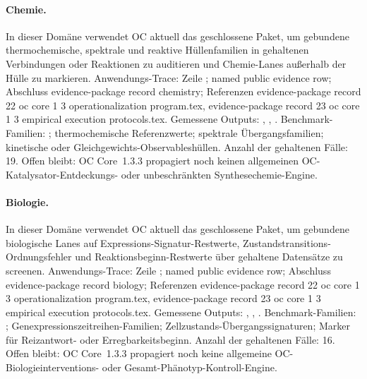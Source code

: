 \paragraph{Chemie.}
In dieser Domäne verwendet OC aktuell das geschlossene Paket, um gebundene thermochemische, spektrale und reaktive Hüllenfamilien in gehaltenen Verbindungen oder Reaktionen zu auditieren und Chemie-Lanes außerhalb der Hülle zu markieren.
Anwendungs-Trace: Zeile ; named public evidence row; \allowbreak Abschluss evidence-package record chemistry; \allowbreak Referenzen evidence-package record 22 oc core 1 3 operationalization program.tex, \allowbreak evidence-package record 23 oc core 1 3 empirical execution protocols.tex.
Gemessene Outputs: , , .
Benchmark-Familien: ; thermochemische Referenzwerte; spektrale Übergangsfamilien; kinetische oder Gleichgewichts-\allowbreak Observableshüllen.
Anzahl der gehaltenen Fälle: 19.
Offen bleibt: OC Core~1.3.3 propagiert noch keinen allgemeinen OC-Katalysator-Entdeckungs- oder unbeschränkten Synthesechemie-Engine.

\paragraph{Biologie.}
In dieser Domäne verwendet OC aktuell das geschlossene Paket, um gebundene biologische Lanes auf Expressions-Signatur-Restwerte, Zustandstransitions-Ordnungsfehler und Reaktionsbeginn-Restwerte über gehaltene Datensätze zu screenen.
Anwendungs-Trace: Zeile ; named public evidence row; \allowbreak Abschluss evidence-package record biology; \allowbreak Referenzen evidence-package record 22 oc core 1 3 operationalization program.tex, \allowbreak evidence-package record 23 oc core 1 3 empirical execution protocols.tex.
Gemessene Outputs: , , .
Benchmark-Familien: ; Genexpressionszeitreihen-Familien; Zellzustands-\allowbreak Übergangssignaturen; Marker für Reizantwort- oder Erregbarkeitsbeginn.
Anzahl der gehaltenen Fälle: 16.
Offen bleibt: OC Core~1.3.3 propagiert noch keine allgemeine OC-Biologieinterventions- oder Gesamt-Phänotyp-Kontroll-Engine.

